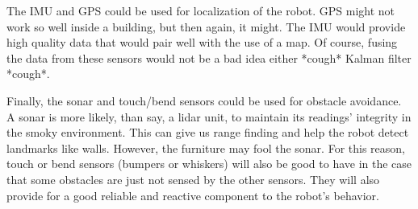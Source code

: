 \documentclass{article}
\begin{document}
\begin{enumerate}
The IMU and GPS could be used for localization of the robot. GPS might not work so well inside a building, but then again, it might. The IMU would provide high quality data that would pair well with the use of a map. Of course, fusing the data from these sensors would not be a bad idea either *cough* Kalman filter *cough*.

Finally, the sonar and touch/bend sensors could be used for obstacle avoidance. A sonar is more likely, than say, a lidar unit, to maintain its readings' integrity in the smoky environment. This can give us range finding and help the robot detect landmarks like walls. However, the furniture may fool the sonar. For this reason, touch or bend sensors (bumpers or whiskers) will also be good to have in the case that some obstacles are just not sensed by the other sensors. They will also provide for a good reliable and reactive component to the robot's behavior. \\
\end{enumerate}
\end{document}
